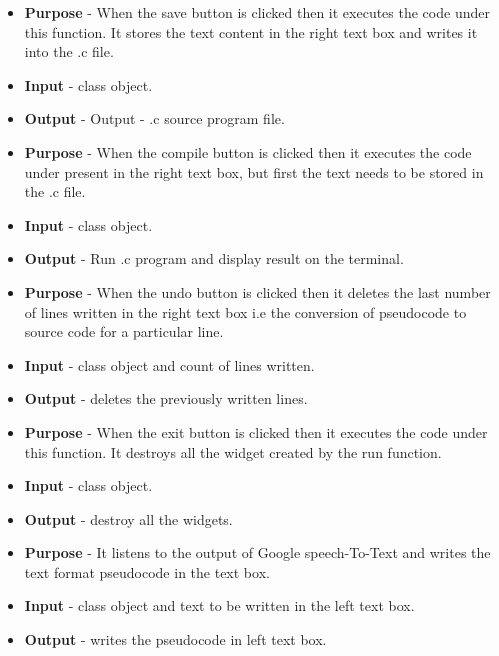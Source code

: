 \documentclass[12pt]{article}
\newcounter{subsubsubsection}[subsubsection]
\begin{document}
\begin{itemize}
    \setlength{\itemsep}{1pt}
    \item \textbf{Purpose} - When the save button is clicked then it executes the code under this function. It stores the text content in the right text box and writes it into the .c file.
    \item \textbf{Input} - class object.
    \item \textbf{Output} - Output - .c source program file.
\end{itemize}

\begin{itemize}
    \setlength{\itemsep}{1pt}
    \item \textbf{Purpose} - When the compile button is clicked then it executes the code under present in the right text box, but first the text needs to be stored in the .c file.
    \item \textbf{Input} - class object.
    \item \textbf{Output} - Run .c program and display result on the terminal.
\end{itemize}

\begin{itemize}
    \setlength{\itemsep}{1pt}
    \item \textbf{Purpose} - When the undo button is clicked then it deletes the last number of lines written in the right text box i.e the conversion of pseudocode to source code for a particular line.
    \item \textbf{Input} - class object and count of lines written.
    \item \textbf{Output} - deletes the previously written lines.
\end{itemize}

\begin{itemize}
    \setlength{\itemsep}{1pt}
    \item \textbf{Purpose} - When the exit button is clicked then it executes the code under this function. It destroys all the widget created by the run function.
    \item \textbf{Input} - class object.
    \item \textbf{Output} - destroy all the widgets.
\end{itemize}

\begin{itemize}
    \setlength{\itemsep}{1pt}
    \item \textbf{Purpose} - It listens to the output of Google speech-To-Text  and writes the text format pseudocode in the text box.
    \item \textbf{Input} -  class object and text to be written in the left text box.
    \item \textbf{Output} - writes the pseudocode in left text box.
\end{itemize}
\end{document}
